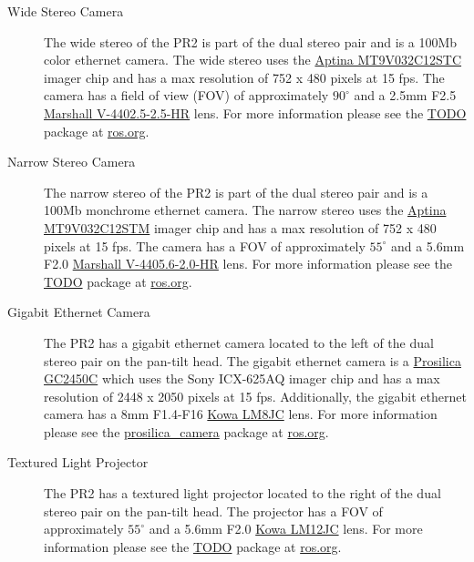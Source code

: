 \begin{description}

\item[Wide Stereo Camera]
The wide stereo of the PR2 is part of the dual stereo pair and is a 100Mb color ethernet camera. The wide stereo uses the
\href{http://www.aptina.com/products/image_sensors/mt9v032c12stc/#overview}{Aptina MT9V032C12STC} imager chip
and has a max resolution of 752 x 480 pixels at 15 fps. The camera has a field of view (FOV) of approximately 
$90^\circ$ and a 2.5mm F2.5 \href{http://www.mars-cam.com/lenses/ccd_cmos/Technology%20Report(V-4402.5-2.5-HR).pdf}{Marshall V-4402.5-2.5-HR} 
lens. For more information please see the \href{http://www.ros.org/wiki/wge100_camera}{TODO} package
at \href{http://www.ros.org}{ros.org}.

\item[Narrow Stereo Camera]
The narrow stereo of the PR2 is part of the dual stereo pair and is a 100Mb monchrome ethernet camera. 
The narrow stereo uses the \href{http://www.aptina.com/products/image_sensors/mt9v032c12stm/#overview}{Aptina MT9V032C12STM} 
imager chip and has a max resolution of 752 x 480 pixels at 15 fps. The camera has a FOV of approximately $55^\circ$ and 
a 5.6mm F2.0  \href{http://www.mars-cam.com/lenses/ccd_cmos/Technology%20Report(V-4405.6-2.0-HR).pdf}{Marshall V-4405.6-2.0-HR}
lens. For more information please see the \href{http://www.ros.org/wiki/wge100_camera}{TODO} package
at \href{http://www.ros.org}{ros.org}.

\item[Gigabit Ethernet Camera]
The PR2 has a gigabit ethernet camera located to the left of the dual stereo pair on the pan-tilt head. 
The gigabit ethernet camera is a \href{http://www.prosilica.com/products/gc2450.html}{Prosilica GC2450C} 
which uses the Sony ICX-625AQ imager chip and has a max resolution of 2448 x 2050 pixels at 15 fps. 
Additionally, the gigabit ethernet camera has a 8mm F1.4-F16 \href{http://www.kowascope.com/frontend/proddetail.asp?pn=LM8JC&co=10000348}{Kowa LM8JC} lens.
For more information please see the \href{http://www.ros.org/wiki/prosilica_camera}{prosilica\_camera} package
at \href{http://www.ros.org}{ros.org}.

\item[Textured Light Projector]
The PR2 has a textured light projector located to the right of the dual stereo pair on the pan-tilt head. The projector has a 
FOV of approximately $55^\circ$ and a 5.6mm F2.0 \href{http://www.kowascope.com/frontend/proddetail.asp?pn=LM12JC&co=10000348}{Kowa LM12JC} 
lens.  For more information please see the \href{http://www.ros.org/wiki/TODO}{TODO} package at \href{http://www.ros.org}{ros.org}.

\end{description}

